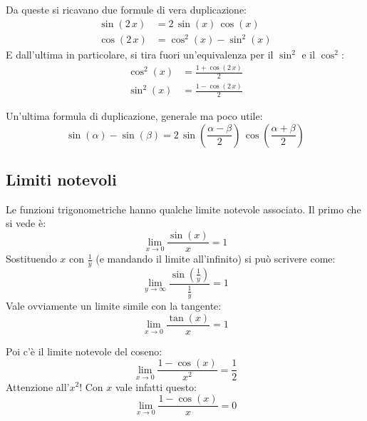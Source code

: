 Da queste si ricavano due formule di vera duplicazione:
\begin{align*}
\sin( 2 \, x) &= 2 \, \sin (x) \, \cos (x) \\
\cos (2 \, x) &= \cos^2 (x) - \sin^2 (x)
\end{align*}
E dall'ultima in particolare, si tira fuori un'equivalenza per il $\sin^2$ e il $\cos^2$:
\begin{align*}
\cos^2 (x) &= \frac{1 + \cos (2 \, x)}{2} \\
\sin^2 (x) &= \frac{1 - \cos (2 \, x)}{2}
\end{align*}

Un'ultima formula di duplicazione, generale ma poco utile:
\[
\sin(\alpha) - \sin(\beta) = 
2 \, \sin \left( \frac{\alpha - \beta}{2} \right) \, \cos \left( \frac{\alpha + \beta}{2} \right)
\]

\subsection{Limiti notevoli}

Le funzioni trigonometriche hanno qualche limite notevole associato. Il primo che si vede \`e:
\[
\lim_{x \to 0} \frac{\sin (x)}{x} = 1
\]
Sostituendo $x$ con $\frac{1}{y}$ (e mandando il limite all'infinito) si pu\`o scrivere come:
\[
\lim_{y \to \infty} \frac{\sin \left( \frac{1}{y} \right) }{\frac{1}{y}} = 1
\]
Vale ovviamente un limite simile con la tangente:
\[
\lim_{x \to 0} \frac{\tan (x)}{x} = 1
\]

Poi c'\`e il limite notevole del coseno:
\[
\lim_{x \to 0} \frac{1 - \cos (x)}{x^2} = \frac{1}{2}
\]
Attenzione all'$x^2$! Con $x$ vale infatti questo:
\[
\lim_{x \to 0} \frac{1 - \cos (x)}{x} = 0
\]
